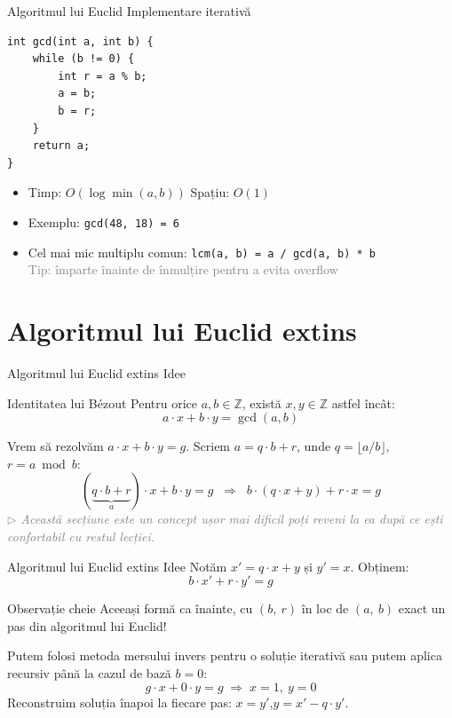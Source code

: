 ﻿\documentclass{beamer}
\begin{document}
\begin{frame}{Algoritmul lui Euclid \textemdash{} Implementare iterativă}
  \begin{center}
  \begin{lstlisting}
int gcd(int a, int b) {
    while (b != 0) {
        int r = a % b;
        a = b;
        b = r;
    }
    return a;
}
  \end{lstlisting}
  \end{center}
  \begin{itemize}
    \item Timp: $O(\log \min(a, b))$ \quad Spațiu: $O(1)$
    \item Exemplu: \lstinline[keepspaces=true]|gcd(48, 18) = 6|
    \item Cel mai mic multiplu comun: \lstinline[keepspaces=true]|lcm(a, b) = a / gcd(a, b) * b| \\
      {\footnotesize\textcolor{gray}{Tip: împarte înainte de înmulțire pentru a evita overflow}}
  \end{itemize}
\end{frame}

\section{Algoritmul lui Euclid extins}

\begin{frame}{Algoritmul lui Euclid extins \textemdash{} Idee}
  \begin{block}{Identitatea lui Bézout}
    Pentru orice $a, b \in \mathbb{Z}$, există $x, y \in \mathbb{Z}$ astfel încât:
    \[ a \cdot x + b \cdot y = \gcd(a, b) \]
  \end{block}
  \medskip
  Vrem să rezolvăm $a \cdot x + b \cdot y = g$. Scriem $a = q \cdot b + r$, unde $q = \lfloor a / b \rfloor$, $r = a \bmod b$:
  \[
    (\underbrace{q \cdot b + r}_{a}) \cdot x + b \cdot y = g
    \;\;\Rightarrow\;\;
    b \cdot (q \cdot x + y) + r \cdot x = g
  \]
  \vfill
  {\footnotesize\textcolor{gray}{\textit{$\triangleright$ Această secțiune este un concept ușor mai dificil \textemdash{} poți reveni la ea după ce ești confortabil cu restul lecției.}}}
\end{frame}

\begin{frame}{Algoritmul lui Euclid extins \textemdash{} Idee}
  Notăm $x' = q \cdot x + y$ și $y' = x$. Obținem:
  \[
    b \cdot x' + r \cdot y' = g
  \]
  \begin{block}{Observație cheie}
    Aceeași formă ca înainte, cu $(b,\ r)$ în loc de $(a,\ b)$ \textemdash{} exact un pas din algoritmul lui Euclid!
  \end{block}
  \medskip
  Putem folosi metoda mersului invers pentru o soluție iterativă sau putem aplica recursiv până la cazul de bază $b = 0$:
  \[
    g \cdot x + 0 \cdot y = g \;\Rightarrow\; x = 1,\ y = 0
  \]
  Reconstruim soluția înapoi la fiecare pas: $x = y'$,\quad $y = x' - q \cdot y'$.
\end{frame}
\end{document}
